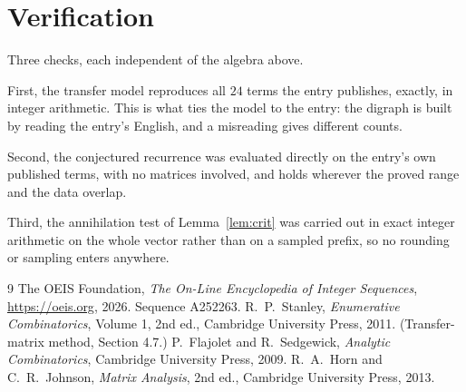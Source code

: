 \documentclass[11pt,a4paper]{article}
\theoremstyle{plain}
\theoremstyle{definition}
\begin{document}
\section{Verification}

Three checks, each independent of the algebra above.

First, the transfer model reproduces all $24$ terms the entry publishes, exactly, in
integer arithmetic. This is what ties the model to the entry: the digraph is built by reading
the entry's English, and a misreading gives different counts.

Second, the conjectured recurrence was evaluated directly on the entry's own published terms,
with no matrices involved, and holds wherever the proved range and the data overlap.

Third, the annihilation test of Lemma~\ref{lem:crit} was carried out in exact integer
arithmetic on the whole vector rather than on a sampled prefix, so no rounding or sampling
enters anywhere.

\begin{thebibliography}{9}
 The OEIS Foundation, \emph{The On-Line Encyclopedia of Integer
Sequences}, \url{https://oeis.org}, 2026. Sequence A252263.
 R.~P.~Stanley, \emph{Enumerative Combinatorics}, Volume 1, 2nd ed.,
Cambridge University Press, 2011. (Transfer-matrix method, Section 4.7.)
 P.~Flajolet and R.~Sedgewick, \emph{Analytic Combinatorics}, Cambridge
University Press, 2009.
 R.~A.~Horn and C.~R.~Johnson, \emph{Matrix Analysis}, 2nd ed., Cambridge
University Press, 2013.
\end{thebibliography}
\end{document}
